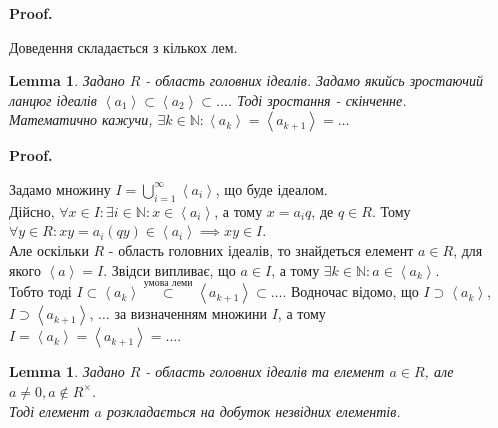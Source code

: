 \documentclass[a4paper, 10pt]{article}
\makeatletter
\theoremstyle{theoremdd}
\theoremstyle{theoremdd}
\theoremstyle{theoremdd}
\theoremstyle{theoremdd}
\theoremstyle{theoremdd}
\theoremstyle{theoremdd}
\theoremstyle{theoremdd}
\newtheorem{lemma}[theorem]{Lemma}
\theoremstyle{theoremdd}
\renewenvironment{proof}[1][Proof.\\]{\par
\pushQED{\hfill \qed}%
\normalfont \topsep6\p@\@plus6\p@\relax
\trivlist
\item\relax
{\bfseries
#1\@addpunct{.}}\hspace\labelsep\ignorespaces
}{%
\popQED\endtrivlist\@endpefalse
}
\makeatother
\begin{document}
\begin{proof}
Доведення складається з кількох лем.
\begin{lemma}
Задано $R$ - область головних ідеалів. Задамо якийсь зростаючий ланцюг ідеалів $\left< a_1 \right> \subset \left< a_2 \right> \subset \dots$. Тоді зростання - скінченне.\\
Математично кажучи, $\exists k \in \mathbb{N}: \left<a_k \right> = \left< a_{k+1} \right> = \dots$
\end{lemma}

\begin{proof}
Задамо множину $I = \displaystyle\bigcup_{ i =1}^\infty \left< a_i \right>$, що буде ідеалом.\\
Дійсно, $\forall x \in I: \exists i \in \mathbb{N}: x \in \left< a_i \right>$, а тому $x = a_i q$, де $q \in R$. Тому $\forall y \in R: xy = a_i(qy) \in \left< a_i \right> \implies xy \in I$.\\
Але оскільки $R$ - область головних ідеалів, то знайдеться елемент $a \in R$, для якого $\left< a \right> = I$. Звідси випливає, що $a \in I$, а тому $\exists k \in \mathbb{N}: a \in \left< a_k \right>$.\\
Тобто тоді $I \subset \left< a_k \right> \overset{\text{умова леми}}{\subset} \left< a_{k+1} \right> \subset \dots$. Водночас відомо, що $I \supset \left< a_k \right>$, $I \supset \left< a_{k+1} \right>$, $\dots$ за визначенням множини $I$, а тому \\ $I = \left< a_k \right> = \left< a_{k+1} \right> = \dots$.
\end{proof}

\begin{lemma}
Задано $R$ - область головних ідеалів та елемент $a \in R$, але $a \neq 0, a \not \in R^\times$.\\
Тоді елемент $a$ розкладається на добуток незвідних елементів.
\end{lemma}


\end{proof}
\end{document}
